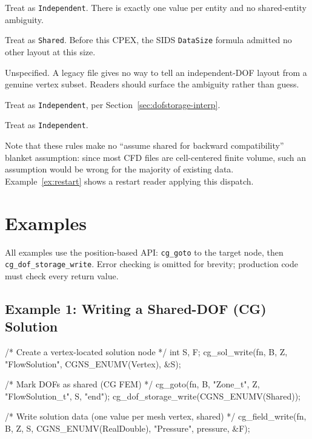 \documentclass[11pt,letterpaper]{article}
\makeatletter
\let\cgns@orig@lstlisting\lstlisting
\let\cgns@endorig@lstlisting\endlstlisting
\renewenvironment{lstlisting}
  {\par\needspace{5\baselineskip}\nolinenumbers\cgns@orig@lstlisting}
  {\cgns@endorig@lstlisting\par\linenumbers}
\makeatother
\begin{document}
\begin{description}[leftmargin=2em]
\item[\texttt{CellCenter}, \texttt{FaceCenter}, \texttt{EdgeCenter},
  \texttt{[IJK]FaceCenter}] Treat as \texttt{Independent}.  There is
  exactly one value per entity and no shared-entity ambiguity.

\item[\texttt{Vertex} with $\texttt{DataSize} = \texttt{VertexSize}$]
  Treat as \texttt{Shared}.  Before this CPEX, the SIDS
  \texttt{DataSize} formula admitted no other layout at this size.

\item[\texttt{Vertex} with a \texttt{PointList}] Unspecified.  A
  legacy file gives no way to tell an independent-DOF layout from a
  genuine vertex subset.  Readers should surface the ambiguity rather
  than guess.

\item[\texttt{InterpolationPoints} (CPEX~0045)] Treat as
  \texttt{Independent}, per Section~\ref{sec:dofstorage-interp}.

\item[\texttt{IntegrationPoint} (CPEX~0047)] Treat as
  \texttt{Independent}.
\end{description}

Note that these rules make no ``assume shared for backward
compatibility'' blanket assumption: since most CFD files are
cell-centered finite volume, such an assumption would be wrong for the
majority of existing data.  Example~\ref{ex:restart} shows a restart
reader applying this dispatch.

\section{Examples}

All examples use the position-based API: \texttt{cg\_goto} to the
target node, then \texttt{cg\_dof\_storage\_write}.  Error checking is
omitted for brevity; production code must check every return value.

\subsection{Example 1: Writing a Shared-DOF (CG) Solution}
\label{ex:cg-write}

\begin{lstlisting}[language=C]
/* Create a vertex-located solution node */
int S, F;
cg_sol_write(fn, B, Z, "FlowSolution", CGNS_ENUMV(Vertex), &S);

/* Mark DOFs as shared (CG FEM) */
cg_goto(fn, B, "Zone_t", Z, "FlowSolution_t", S, "end");
cg_dof_storage_write(CGNS_ENUMV(Shared));

/* Write solution data (one value per mesh vertex, shared) */
cg_field_write(fn, B, Z, S, CGNS_ENUMV(RealDouble),
    "Pressure", pressure, &F);
\end{lstlisting}
\end{document}
